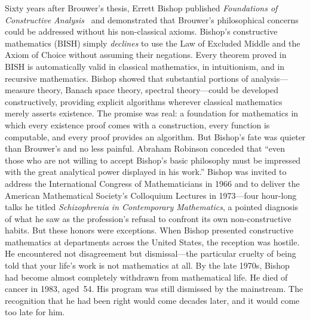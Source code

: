 \documentclass[11pt,a4paper]{report}
\theoremstyle{plain}
\theoremstyle{definition}
\theoremstyle{remark}
\newcommand{\BISH}{\mathrm{BISH}}
\begin{document}
Sixty years after Brouwer's thesis, Errett Bishop published \emph{Foundations of Constructive Analysis}~\cite{Bishop1967} and demonstrated that Brouwer's philosophical concerns could be addressed without his non-classical axioms. Bishop's constructive mathematics ($\BISH$) simply \emph{declines} to use the Law of Excluded Middle and the Axiom of Choice without assuming their negations. Every theorem proved in $\BISH$ is automatically valid in classical mathematics, in intuitionism, and in recursive mathematics. Bishop showed that substantial portions of analysis---measure theory, Banach space theory, spectral theory---could be developed constructively, providing explicit algorithms wherever classical mathematics merely asserts existence. The promise was real: a foundation for mathematics in which every existence proof comes with a construction, every function is computable, and every proof provides an algorithm. But Bishop's fate was quieter than Brouwer's and no less painful. Abraham Robinson conceded that ``even those who are not willing to accept Bishop's basic philosophy must be impressed with the great analytical power displayed in his work.'' Bishop was invited to address the International Congress of Mathematicians in 1966 and to deliver the American Mathematical Society's Colloquium Lectures in 1973---four hour-long talks he titled \emph{Schizophrenia in Contemporary Mathematics}, a pointed diagnosis of what he saw as the profession's refusal to confront its own non-constructive habits. But these honors were exceptions. When Bishop presented constructive mathematics at departments across the United States, the reception was hostile. He encountered not disagreement but dismissal---the particular cruelty of being told that your life's work is not mathematics at all. By the late 1970s, Bishop had become almost completely withdrawn from mathematical life. He died of cancer in 1983, aged~54. His program was still dismissed by the mainstream. The recognition that he had been right would come decades later, and it would come too late for him.
\end{document}
